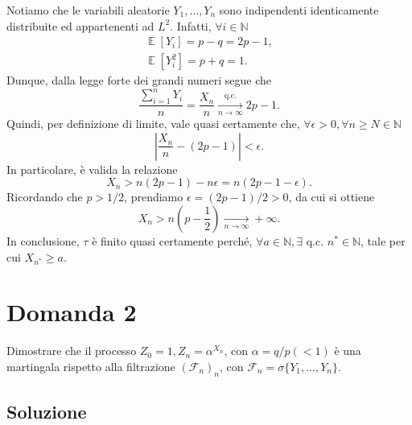\documentclass[
	12pt, %
]{fphw}
\DeclareMathOperator{\Ev}{\mathbb{E}}%
\begin{document}
Notiamo che le variabili aleatorie $Y_1, \dots, Y_n$ sono indipendenti identicamente distribuite ed appartenenti ad $L^2$.
Infatti, $\forall i \in \mathbb{N}$
\begin{equation*}
    \begin{gathered}
        \Ev[Y_i] = p - q = 2p - 1,\\
        \Ev[Y_i^2] = p + q = 1.
    \end{gathered}
\end{equation*}
Dunque, dalla legge forte dei grandi numeri segue che
\begin{equation*}
    \frac{\sum_{i=1}^n Y_i}{n} = \frac{X_n}{n} \xrightarrow[n \to \infty]{\text{q.c.}} 2p - 1.
\end{equation*}
Quindi, per definizione di limite, vale quasi certamente che, $\forall \epsilon > 0, \forall n \geq N \in \mathbb{N}$
\begin{equation*}
    \left| \frac{X_n}{n} - (2p-1) \right| < \epsilon.
\end{equation*}
In particolare, è valida la relazione
\begin{equation*}
    X_n > n(2p-1) - n \epsilon = n(2p-1-\epsilon).
\end{equation*}
Ricordando che $p > 1/2$, prendiamo $\epsilon = (2p-1)/2 > 0$, da cui si ottiene
\begin{equation*}
    X_n > n(p - \frac{1}{2}) \xrightarrow[n \to \infty]{} + \infty.
\end{equation*}
In conclusione, $\tau$ è finito quasi certamente perché, $\forall a \in \mathbb{N}, \exists \text{ q.c. } n^* \in \mathbb{N}$, tale per cui $X_{n^*} \geq a$.

\section*{Domanda 2}
\begin{problem}
	Dimostrare che il processo $Z_0 = 1, Z_n = \alpha^{X_n}$, con $\alpha = q/p(< 1)$ è una martingala
	rispetto alla filtrazione $(\mathcal{F}_n)_n$, con $\mathcal{F}_n = \sigma\{Y_1, \dots , Y_n\}$.
	\smallskip
\end{problem}

\subsection*{Soluzione}
\end{document}
